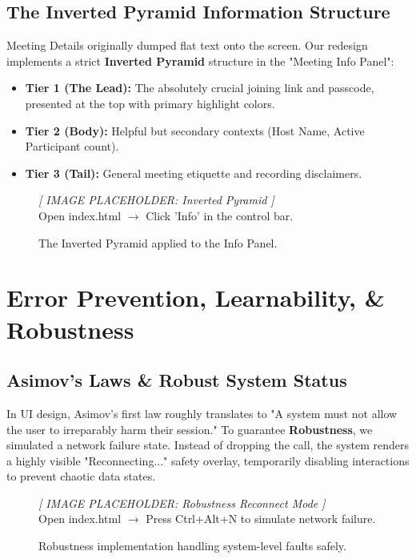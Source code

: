 \documentclass[12pt,a4paper]{article}
\begin{document}
\subsection{The Inverted Pyramid Information Structure}
Meeting Details originally dumped flat text onto the screen. Our redesign implements a strict \textbf{Inverted Pyramid} structure in the "Meeting Info Panel":
\begin{itemize}
    \item \textbf{Tier 1 (The Lead):} The absolutely crucial joining link and passcode, presented at the top with primary highlight colors.
    \item \textbf{Tier 2 (Body):} Helpful but secondary contexts (Host Name, Active Participant count).
    \item \textbf{Tier 3 (Tail):} General meeting etiquette and recording disclaimers.
\end{itemize}

\begin{figure}[h]
    \centering
    \begin{tcolorbox}[colback=gray!10,colframe=gray!50,arc=4mm,height=5cm,valign=center,halign=center]
        \large\textit{[ IMAGE PLACEHOLDER: Inverted Pyramid ]}\\[0.5cm]
        \small Open index.html $\rightarrow$ Click 'Info' in the control bar.
    \end{tcolorbox}
    \caption{The Inverted Pyramid applied to the Info Panel.}
\end{figure}

\section{Error Prevention, Learnability, \& Robustness}

\subsection{Asimov's Laws \& Robust System Status}
In UI design, Asimov's first law roughly translates to "A system must not allow the user to irreparably harm their session." To guarantee \textbf{Robustness}, we simulated a network failure state. Instead of dropping the call, the system renders a highly visible "Reconnecting..." safety overlay, temporarily disabling interactions to prevent chaotic data states.

\begin{figure}[h]
    \centering
    \begin{tcolorbox}[colback=gray!10,colframe=gray!50,arc=4mm,height=5cm,valign=center,halign=center]
        \large\textit{[ IMAGE PLACEHOLDER: Robustness Reconnect Mode ]}\\[0.5cm]
        \small Open index.html $\rightarrow$ Press Ctrl+Alt+N to simulate network failure.
    \end{tcolorbox}
    \caption{Robustness implementation handling system-level faults safely.}
\end{figure}
\end{document}
